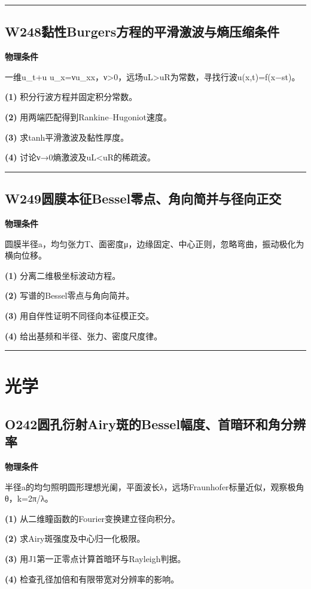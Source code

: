 \documentclass[UTF8,a4paper,11pt,oneside,openany]{ctexbook}
\begin{document}
\par\bigskip\hrule\bigskip
\section*{W248\quad 黏性Burgers方程的平滑激波与熵压缩条件}
\textbf{物理条件}\par 一维u\_t+u u\_x=νu\_xx，ν>0，远场uL>uR为常数，寻找行波u(x,t)=f(x−st)。
\par\noindent\textbf{(1)} 积分行波方程并固定积分常数。
\par\noindent\textbf{(2)} 用两端匹配得到Rankine–Hugoniot速度。
\par\noindent\textbf{(3)} 求tanh平滑激波及黏性厚度。
\par\noindent\textbf{(4)} 讨论ν→0熵激波及uL<uR的稀疏波。

\par\bigskip\hrule\bigskip
\section*{W249\quad 圆膜本征Bessel零点、角向简并与径向正交}
\textbf{物理条件}\par 圆膜半径a，均匀张力T、面密度μ，边缘固定、中心正则，忽略弯曲，振动极化为横向位移。
\par\noindent\textbf{(1)} 分离二维极坐标波动方程。
\par\noindent\textbf{(2)} 写谱的Bessel零点与角向简并。
\par\noindent\textbf{(3)} 用自伴性证明不同径向本征模正交。
\par\noindent\textbf{(4)} 给出基频和半径、张力、密度尺度律。

\par\bigskip\hrule\bigskip
\chapter{光学}
\section*{O242\quad 圆孔衍射Airy斑的Bessel幅度、首暗环和角分辨率}
\textbf{物理条件}\par 半径a的均匀照明圆形理想光阑，平面波长λ，远场Fraunhofer标量近似，观察极角θ，k=2π/λ。
\par\noindent\textbf{(1)} 从二维瞳函数的Fourier变换建立径向积分。
\par\noindent\textbf{(2)} 求Airy斑强度及中心归一化极限。
\par\noindent\textbf{(3)} 用J1第一正零点计算首暗环与Rayleigh判据。
\par\noindent\textbf{(4)} 检查孔径加倍和有限带宽对分辨率的影响。
\end{document}
